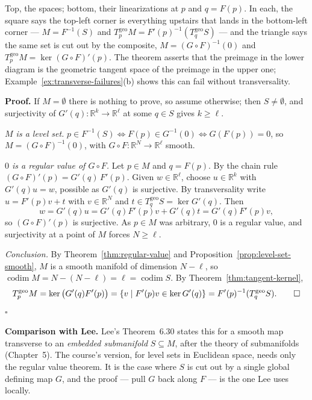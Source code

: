 \documentclass[11pt]{report}
\renewenvironment{proof}[1][Proof]{\noindent\textbf{#1.} }{\hfill$\square$\par\vspace{5pt}}
\newcommand{\geo}{\mathrm{geo}}
\begin{document}
Top, the spaces; bottom, their linearizations at $p$ and $q = F(p)$. In each, the square says the top-left corner is everything upstairs that lands in the bottom-left corner --- $M = F^{-1}(S)$ and $T^{\geo}_pM = F'(p)^{-1}(T^{\geo}_qS)$ --- and the triangle says the same set is cut out by the composite, $M = (G\circ F)^{-1}(0)$ and $T^{\geo}_pM = \ker (G\circ F)'(p)$. The theorem asserts that the preimage in the lower diagram is the geometric tangent space of the preimage in the upper one; Example~\ref{ex:transverse-failures}(b) shows this can fail without transversality.


\begin{proof}
If $M = \emptyset$ there is nothing to prove, so assume otherwise; then $S \neq \emptyset$, and surjectivity of $G'(q) : \mathbb{R}^k \to \mathbb{R}^\ell$ at some $q \in S$ gives $k \ge \ell$.

\emph{$M$ is a level set.} $p \in F^{-1}(S) \iff F(p) \in G^{-1}(0) \iff G(F(p)) = 0$, so $M = (G \circ F)^{-1}(0)$, with $G \circ F : \mathbb{R}^N \to \mathbb{R}^\ell$ smooth.

\emph{$0$ is a regular value of $G \circ F$.} Let $p \in M$ and $q = F(p)$. By the chain rule $(G \circ F)'(p) = G'(q)\,F'(p)$. Given $w \in \mathbb{R}^\ell$, choose $u \in \mathbb{R}^k$ with $G'(q)u = w$, possible as $G'(q)$ is surjective. By transversality write $u = F'(p)v + t$ with $v \in \mathbb{R}^N$ and $t \in T^{\geo}_qS = \ker G'(q)$. Then
\[
w = G'(q)u = G'(q)F'(p)v + G'(q)t = G'(q)F'(p)v ,
\]
so $(G\circ F)'(p)$ is surjective. As $p \in M$ was arbitrary, $0$ is a regular value, and surjectivity at a point of $M$ forces $N \ge \ell$.

\emph{Conclusion.} By Theorem~\ref{thm:regular-value} and Proposition~\ref{prop:level-set-smooth}, $M$ is a smooth manifold of dimension $N - \ell$, so $\operatorname{codim} M = N - (N - \ell) = \ell = \operatorname{codim} S$. By Theorem~\ref{thm:tangent-kernel},
\[
T^{\geo}_pM = \ker\big(G'(q)F'(p)\big) = \{v \mid F'(p)v \in \ker G'(q)\} = F'(p)^{-1}(T^{\geo}_qS). \qedhere
\]
\end{proof}

\textbf{Comparison with Lee.} Lee's Theorem~6.30 states this for a smooth map transverse to an \emph{embedded submanifold} $S \subseteq M$, after the theory of submanifolds (Chapter~5). The course's version, for level sets in Euclidean space, needs only the regular value theorem. It is the case where $S$ is cut out by a single global defining map $G$, and the proof --- pull $G$ back along $F$ --- is the one Lee uses locally.
\end{document}
